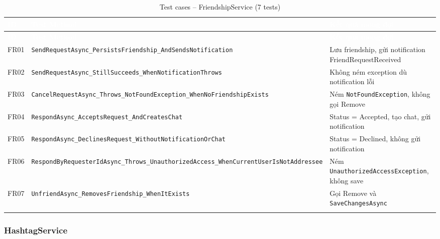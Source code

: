 \documentclass[a4paper]{article}
\begin{document}
\begin{longtable}{|C{0.8cm}|L{5.4cm}|L{7.4cm}|}
\hline
{}
\textcolor{white}{\textbf{ID}} &
\textcolor{white}{\textbf{Test Method}} &
\textcolor{white}{\textbf{Kết quả mong đợi}} \\
\hline
\endfirsthead
\hline
{}
\textcolor{white}{\textbf{ID}} &
\textcolor{white}{\textbf{Test Method}} &
\textcolor{white}{\textbf{Kết quả mong đợi}} \\
\hline
\endhead
\hline
\endfoot

FR01 & \texttt{SendRequestAsync\_PersistsFriendship\_AndSendsNotification} & Lưu friendship, gửi notification FriendRequestReceived \\
\hline
FR02 & \texttt{SendRequestAsync\_StillSucceeds\_WhenNotificationThrows} & Không ném exception dù notification lỗi \\
\hline
{}
FR03 & \texttt{CancelRequestAsync\_Throws\_NotFoundException\_WhenNoFriendshipExists} & Ném \texttt{NotFoundException}, không gọi Remove \\
\hline
FR04 & \texttt{RespondAsync\_AcceptsRequest\_AndCreatesChat} & Status = Accepted, tạo chat, gửi notification \\
\hline
{}
FR05 & \texttt{RespondAsync\_DeclinesRequest\_WithoutNotificationOrChat} & Status = Declined, không gửi notification \\
\hline
FR06 & \texttt{RespondByRequesterIdAsync\_Throws\_UnauthorizedAccess\_WhenCurrentUserIsNotAddressee} & Ném \texttt{UnauthorizedAccessException}, không save \\
\hline
{}
FR07 & \texttt{UnfriendAsync\_RemovesFriendship\_WhenItExists} & Gọi Remove và \texttt{SaveChangesAsync} \\
\hline
\caption{Test cases -- FriendshipService (7 tests)}
\end{longtable}

\subsubsection{HashtagService}
\end{document}
